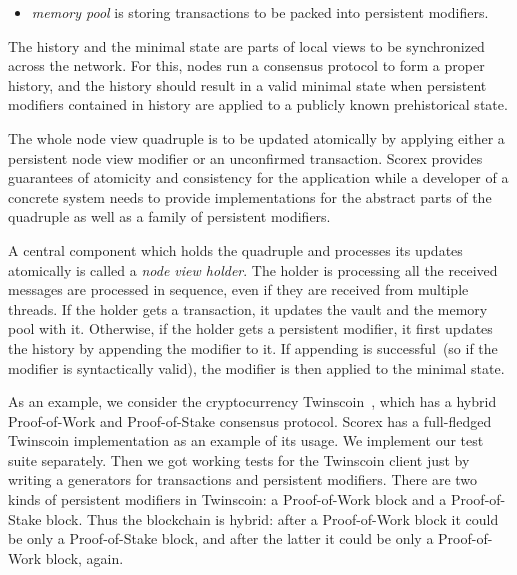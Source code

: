 \begin{itemize}
\item{\em memory pool} is storing transactions to be packed into persistent modifiers.
\end{itemize}

The history and the minimal state are parts of local views to be synchronized across the network. For this, nodes run a consensus protocol to form a proper history, and the history should result in a valid minimal state when persistent modifiers contained in history are applied to a publicly known prehistorical state.

The whole node view quadruple is to be updated atomically by applying either a persistent node view modifier or an unconfirmed transaction. Scorex provides guarantees of atomicity and consistency for the application while a developer of a concrete system needs to provide implementations for the abstract parts of the quadruple as well as a family of persistent modifiers.

A central component which holds the quadruple {\em <history, minimal state, vault, memory pool>} and processes its updates atomically is called a {\em node view holder}. The holder is processing all the received messages are processed in sequence, even if they are received from multiple threads. If the holder gets a transaction, it updates the vault and the memory pool with it. Otherwise, if the holder gets a persistent modifier, it first updates the history by appending the modifier to it. If appending is successful~(so if the modifier is syntactically valid), the modifier is then applied to the minimal state.  

As an example, we consider the cryptocurrency Twinscoin~\cite{cryptoeprint:2017:232}, which has a hybrid Proof-of-Work and Proof-of-Stake consensus protocol. Scorex has a full-fledged Twinscoin implementation as an example of its usage. We implement our test suite separately. Then we got working tests for the Twinscoin client just by writing a generators for transactions and persistent modifiers. There are two kinds of persistent modifiers in Twinscoin: a Proof-of-Work block and a Proof-of-Stake block. Thus the blockchain is hybrid: after a Proof-of-Work block it could be only a Proof-of-Stake block, and after the latter it could be only a Proof-of-Work block, again.   
